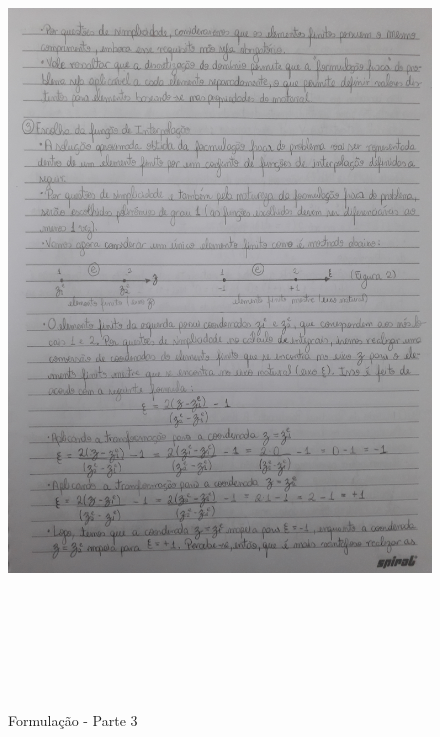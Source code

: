 \documentclass[10pt]{article}
\begin{document}
    \begin{figure}[!htb]
    \centerline{\includegraphics[width=20cm,height=22cm]{Formulação Matemática/Formulacao - Parte 3.jpg}}
    \caption{Formulação - Parte 3}
    \label{fig:fp3}
    \end{figure}
    
\end{document}

